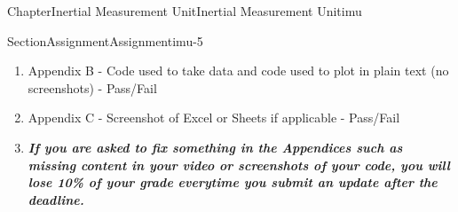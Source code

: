 \documentclass[oneside,10pt,]{book}
\newcommand{\alert}[1]{\textbf{\textit{#1}}}
\numberwithin{equation}{section}
\begin{document}
\begin{chapterptx}{Chapter}{Inertial Measurement Unit}{}{Inertial Measurement Unit}{}{}{imu}
\begin{sectionptx}{Section}{Assignment}{}{Assignment}{}{}{imu-5}
\begin{introduction}{}
\begin{enumerate}
\item{}Appendix B - Code used to take data and code used to plot in plain text (no screenshots) - Pass\slash{}Fail%
\item{}Appendix C - Screenshot of Excel or Sheets if applicable - Pass\slash{}Fail%
\item{}\alert{If you are asked to fix something in the Appendices such as missing content in your video or screenshots of your code, you will lose 10\% of your grade everytime you submit an update after the deadline.}%
\end{enumerate}
\end{introduction}%
\end{sectionptx}
\end{chapterptx}
%
%
\typeout{************************************************}
\typeout{************************************************}
%
\end{document}

